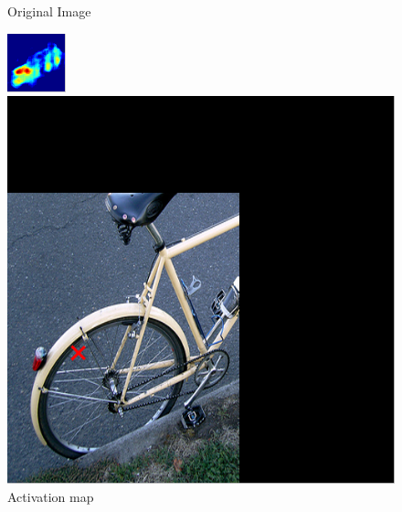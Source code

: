\documentclass{article} %
\begin{document}
\begin{figure}
\begin{subtable}[b]{0.2\linewidth}
		\caption{Original Image}
	\end{subtable}
    \hspace{1.8em}
	\begin{subtable}[b]{0.2\linewidth}
		\includegraphics[width=\linewidth]{figure/2009_004379_origFeat0105.png}
		\caption{Activation map}
	\end{subtable}
    \hspace{1.8em}
	\begin{subtable}[b]{0.2\linewidth}
		\includegraphics[width=\linewidth]{figure/2009_004379_rf0105.png}

\end{subtable}
\end{figure}
\end{document}
